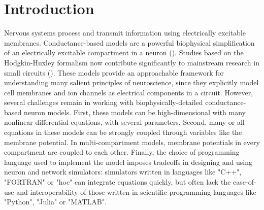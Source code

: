 \documentclass{frontiersSCNS} %
\begin{document}
\section{Introduction}
\label{sec:intro}

Nervous systems process and transmit information using electrically excitable membranes. Conductance-based models are a powerful biophysical simplification of an electrically excitable compartment in a neuron (\cite{hodgkinQuantitativeDescriptionMembrane1952}). Studies based on the Hodgkin-Huxley formalism now contribute significantly to mainstream research in small circuits (\cite{marderTheoryMotion1995, prinzComputationalApproachesNeuronal2010, prinzInsightsModelsRhythmic2006}). These models provide an approachable framework for understanding many salient principles of neuroscience, since they explicitly model cell membranes and ion channels as electrical components in a circuit. However, several challenges remain in working with biophysically-detailed conductance-based neuron models. First, these models can be high-dimensional with many nonlinear differential equations, with several parameters. Second, many or all equations in these models can be strongly coupled through variables like the membrane potential.  In multi-compartment models, membrane potentials in every compartment are coupled to each other. Finally, the choice of programming language used to implement the model imposes tradeoffs in designing and using neuron and network simulators: simulators written in languages like "C++", "FORTRAN" or "hoc" can integrate equations quickly, but often lack the ease-of-use and interoperability of those written in scientific programming languages like "Python", "Julia" or "MATLAB". 
\end{document}

